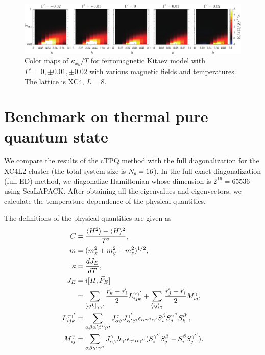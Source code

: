 \documentclass[reprint,amsmath,amssymb,aps,prx]{revtex4-2}
\begin{document}
\begin{figure}
  \begin{center}
    \includegraphics[width=\linewidth]{color_map_Gp_XC4.pdf}
  \end{center}
  \caption{Color maps of $\kappa_{xy}/T$ for ferromagnetic Kitaev model with $\Gamma' = 0, \pm 0.01, \pm 0.02$ with various magnetic fields and temperatures. The lattice is XC4, $L=8$.}
  \label{fig:color_map_Gp_XC4}
\end{figure}

\section{Benchmark on thermal pure quantum state}
We compare the results of the cTPQ method with
the full diagonalization for the XC4L2 cluster (the total system size is $N_{\rm s}=16$).
In the full exact diagonalization (full ED) method, we diagonalize Hamiltonian whose dimension is
$2^{16}=65536$ using ScaLAPACK. 
After obtaining all the eigenvalues and eigenvectors,
we calculate the temperature dependence of the 
physical quantities.

The definitions of the physical quantities are given as
\begin{align}
C&= \frac{\langle H^2\rangle-\langle H\rangle^2}{T^2}, \\
m&= (m_{x}^2+m_{y}^2+m_z^2)^{1/2}, \\
\kappa&= \frac{d J_{E}}{dT}, \\
J_{E} &= i[H,\vec{P}_{E}] \\ \notag
&=\sum_{[ijk]_{\gamma\gamma^{\prime}}}
\frac{\vec{r}_k-\vec{r}_i}{2}L_{ijk}^{\gamma\gamma^{\prime}}+
\sum_{\langle ij\rangle_{\gamma}}
\frac{\vec{r}_j-\vec{r}_i}{2}M_{ij}^{\gamma}, \\
L_{ijk}^{\gamma\gamma^{\prime}}&=\sum_{\alpha\beta\alpha^{\prime}\beta^{\prime}\gamma{\prime\prime}}
J_{\alpha\beta}^{\gamma}
J_{\alpha^{\prime}\beta^{\prime}}^{\gamma^{\prime}}
\epsilon_{\alpha\gamma^{\prime\prime}\alpha^{\prime}}
S_{i}^{\beta}S_{j}^{\gamma^{\prime\prime}}S_{k}^{\beta^{\prime}}, \\
M_{ij}^{\gamma}&= \sum_{\alpha\beta\gamma^{\prime}\gamma^{\prime\prime}}
J_{\alpha\beta}^{\gamma}h_{\gamma^{\prime}}\epsilon_{\gamma^{\prime}\alpha\gamma^{\prime\prime}}
(S_{i}^{\gamma^{\prime\prime}}S_{j}^{\beta}-S_{i}^{\beta}S_{j}^{\gamma^{\prime\prime}}).
\end{align}
\end{document}
